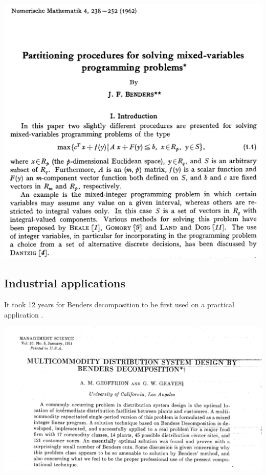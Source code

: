 \begin{center}
\includegraphics[width=14cm]{fig/fig1}
\end{center}


\newpage

\subsection*{Industrial applications}


It took 12 years for Benders decomposition to be first used on a practical application  \cite{geoffrion74multicommodity}. 


\begin{center}
\includegraphics[width=14cm]{fig//fig2}
\end{center}


